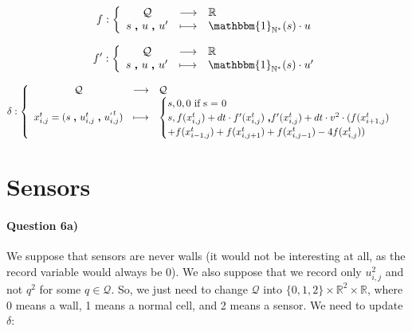 \documentclass[a4paper,12pt]{article}
\begin{document}
\begin{eqnarray*}
f : \left \{ \begin{array}{c c l }
  \mathcal{Q} & \longrightarrow & \mathbb{R} \\
  s \ \pmb{,} \ u\ \pmb{,} \ u' & \longmapsto & \mathbbm{1}_{\mathbb{N}^*}(s) \cdot u
  \end{array} \right .
\end{eqnarray*}


\begin{eqnarray*}
f' : \left \{ \begin{array}{c c l }
  \mathcal{Q} & \longrightarrow & \mathbb{R} \\
  s \ \pmb{,} \ u\ \pmb{,} \ u' & \longmapsto & \mathbbm{1}_{\mathbb{N}^*}(s) \cdot u'
  \end{array} \right .
\end{eqnarray*}


\begin{eqnarray*}
\delta : \left \{ \begin{array}{c c l }
  \mathcal{Q} & \longrightarrow & \mathcal{Q} \\
  x_{i,j}^t = (s \ \pmb{,} \ u^{t}_{i,j}\ \pmb{,} \ u^{_{'} t}_{i,j}) & \longmapsto &
  \begin{cases}s, 0, 0\mbox{ if s = 0}\\
    s, f(x^{t}_{i,j}) + dt \cdot f'(x^t_{i,j})\ \pmb{,} f'(x^t_{i,j}) + dt \cdot v^2 \cdot (f(x^t_{i+1,j}) \\+ f(x^t_{i-1, j}) + f(x^t_{i, j+1}) + f(x^t_{i, j-1}) - 4 f(x^t_{i, j})) 
    \end{cases}\\
  \end{array} \right .
\end{eqnarray*}

\section{Sensors}

\paragraph{Question 6a)} We suppose that sensors are never walls (it would not be interesting at all, as the record variable would always be 0). We also suppose that we record only $u_{i,j}^2$ and not $q^2$ for some $q \in \mathcal{Q}$. So, we just need to change $\mathcal{Q}$ into $\{0,1,2\} \times \mathbb{R}^2 \times \mathbb{R}$, where 0 means a wall, 1 means a normal cell, and 2 means a sensor. We need to update $\delta$:
\end{document}
